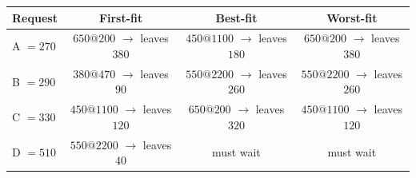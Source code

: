 \begin{tabular}{@{}lccc@{}}
\toprule
\textbf{Request} & \textbf{First-fit} & \textbf{Best-fit} & \textbf{Worst-fit}\\
\midrule
A $= 270$ & $650@200$ $\to$ leaves $380$ & $450@1100$ $\to$ leaves $180$ & $650@200$ $\to$ leaves $380$\\
B $= 290$ & $380@470$ $\to$ leaves $90$ & $550@2200$ $\to$ leaves $260$ & $550@2200$ $\to$ leaves $260$\\
C $= 330$ & $450@1100$ $\to$ leaves $120$ & $650@200$ $\to$ leaves $320$ & $450@1100$ $\to$ leaves $120$\\
D $= 510$ & $550@2200$ $\to$ leaves $40$ & \textcolor{red!60!black}{must wait} & \textcolor{red!60!black}{must wait}\\
\bottomrule
\end{tabular}
